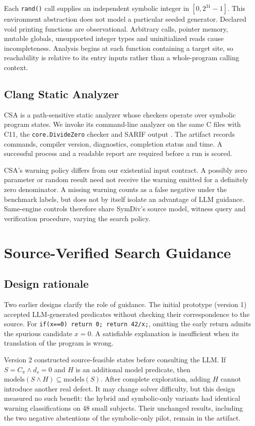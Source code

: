 \documentclass[sigconf]{acmart}
\begin{document}
Each \texttt{rand()} call supplies an independent symbolic integer in
$[0,2^{31}-1]$. This environment abstraction does not model a particular
seeded generator. Declared void printing functions are observational.
Arbitrary calls, pointer memory, mutable globals, unsupported integer types
and uninitialized reads cause incompleteness. Analysis begins at each
function containing a target site, so reachability is relative to its entry
inputs rather than a whole-program calling context.

\subsection{Clang Static Analyzer}
CSA is a path-sensitive static analyzer whose checkers operate over symbolic
program states. We invoke its command-line analyzer on the same C files with
C11, the \texttt{core.DivideZero} checker and SARIF output
\cite{clang-checkers,clang-cli}. The artifact records commands, compiler
version, diagnostics, completion status and time. A successful process and a
readable report are required before a run is scored.

CSA's warning policy differs from our existential input contract. A possibly
zero parameter or random result need not receive the warning emitted for a
definitely zero denominator. A missing warning counts as a false negative
under the benchmark labels, but does not by itself isolate an advantage of
LLM guidance. Same-engine controls therefore share SymDiv's source model,
witness query and verification procedure, varying the search policy.

\section{Source-Verified Search Guidance}
\label{sec:method}
\subsection{Design rationale}
Two earlier designs clarify the role of guidance. The initial prototype
(version 1) accepted LLM-generated predicates without checking their
correspondence to the source. For
\texttt{if(x==0) return 0; return 42/x;}, omitting the early return admits the
spurious candidate $x=0$. A satisfiable explanation is insufficient when
its translation of the program is wrong.

Version 2 constructed source-feasible states before consulting the LLM.
If $S=C_\pi\land d_s=0$ and $H$ is an additional model predicate, then
$\mathrm{models}(S\land H)\subseteq\mathrm{models}(S)$.
After complete exploration, adding $H$ cannot introduce another real defect.
It may change solver difficulty, but this design measured no such benefit:
the hybrid and symbolic-only variants had identical warning classifications
on 48 small subjects. Their unchanged results, including the two negative
abstentions of the symbolic-only pilot, remain in the artifact.
\end{document}
